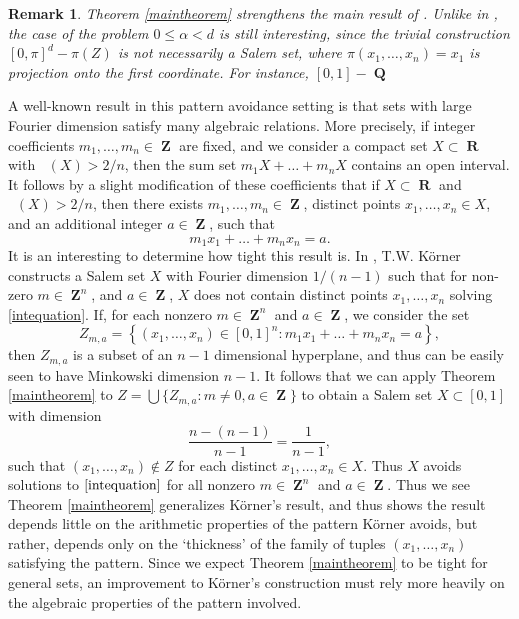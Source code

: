 \documentclass[12pt,reqno]{article}
\numberwithin{equation}{section}
\DeclareMathOperator{\fordim}{\dim_{\mathbf{F}}}
\DeclareMathOperator{\RR}{\mathbf{R}}
\DeclareMathOperator{\ZZ}{\mathbf{Z}}
\DeclareMathOperator{\QQ}{\mathbf{Q}}
\newtheorem*{remark}{Remark}
\begin{document}
\begin{remark}
    Theorem \ref{maintheorem} strengthens the main result of \cite{OurPaper}. Unlike in \cite{OurPaper}, the case of the problem $0 \leq \alpha < d$ is still interesting, since the trivial construction $[0,\pi]^d - \pi(Z)$ is not necessarily a Salem set, where $\pi(x_1, \dots, x_n) = x_1$ is projection onto the first coordinate. For instance, $[0,1] - \QQ$
\end{remark}

A well-known result in this pattern avoidance setting is that sets with large Fourier dimension satisfy many algebraic relations. More precisely, if integer coefficients $m_1, \dots, m_n \in \ZZ$ are fixed, and we consider a compact set $X \subset \RR$ with $\fordim(X) > 2/n$, then the sum set $m_1 X + \dots + m_n X$ contains an open interval. It follows by a slight modification of these coefficients that if $X \subset \RR$ and $\fordim(X) > 2/n$, then there exists $m_1, \dots, m_n \in \ZZ$, distinct points $x_1, \dots, x_n \in X$, and an additional integer $a \in \ZZ$, such that
%
\begin{equation} \label{intequation}
    m_1 x_1 + \dots + m_n x_n = a.
\end{equation}
%
It is an interesting to determine how tight this result is. In \cite{Korner2}, T.W. K\"{o}rner constructs a Salem set $X$ with Fourier dimension $1/(n-1)$ such that for non-zero $m \in \ZZ^n$, and $a \in \ZZ$, $X$ does not contain distinct points $x_1, \dots, x_n$ solving \eqref{intequation}. If, for each nonzero $m \in \ZZ^n$ and $a \in \ZZ$, we consider the set
%
\[ Z_{m,a} = \left\{ (x_1, \dots, x_n) \in [0,1]^n : m_1x_1 + \dots + m_n x_n = a \right\}, \]
%
then $Z_{m,a}$ is a subset of an $n-1$ dimensional hyperplane, and thus can be easily seen to have Minkowski dimension $n-1$. It follows that we can apply Theorem \ref{maintheorem} to $Z = \bigcup \{ Z_{m,a} : m \neq 0, a \in \ZZ \}$ to obtain a Salem set $X \subset [0,1]$ with dimension
%
\[ \frac{n - (n-1)}{n - 1} = \frac{1}{n-1}, \]
%
such that $(x_1, \dots, x_n) \not \in Z$ for each distinct $x_1, \dots, x_n \in X$. Thus $X$ avoids solutions to $\eqref{intequation}$ for all nonzero $m \in \ZZ^n$ and $a \in \ZZ$. Thus we see Theorem \ref{maintheorem} generalizes K\"{o}rner's result, and thus shows the result depends little on the arithmetic properties of the pattern K\"{o}rner avoids, but rather, depends only on the `thickness' of the family of tuples $(x_1, \dots, x_n)$ satisfying the pattern. Since we expect Theorem \ref{maintheorem} to be tight for general sets, an improvement to K\"{o}rner's construction must rely more heavily on the algebraic properties of the pattern involved.
\end{document}

